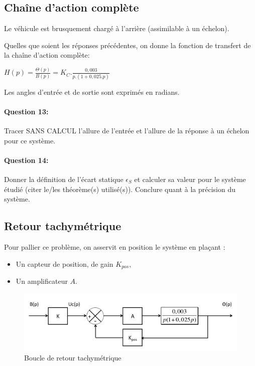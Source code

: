 \subsection{Chaîne d'action complète}

Le véhicule est brusquement chargé à l'arrière (assimilable à un échelon).

Quelles que soient les réponses précédentes, on donne la fonction de transfert de la chaîne d'action complète:

\begin{center}
$H(p)=\frac{\Theta(p)}{B(p)}=K_C.\frac{0,003}{p.(1+0,025.p)}$
\end{center}

Les angles d'entrée et de sortie sont exprimés en radians.

\paragraph{Question 13:} Tracer SANS CALCUL l'allure de l'entrée et l'allure de la réponse à un échelon pour ce système.

\paragraph{Question 14:} Donner la définition de l'écart statique $\epsilon_S$ et calculer sa valeur pour le système étudié (citer le/les théorème(s) utilisé(s)). Conclure quant à la précision du système. 

\subsection{Retour tachymétrique}

Pour pallier ce problème, on asservit en position le système en plaçant :
\begin{itemize}
 \item Un capteur de position, de gain $K_{pos}$,
 \item Un amplificateur $A$.
\end{itemize}

\begin{figure}[!h]
  \centering
  \includegraphics[width=0.6\linewidth]{img/phare4}
  \caption{Boucle de retour tachymétrique}
  \label{phare4}
\end{figure}

